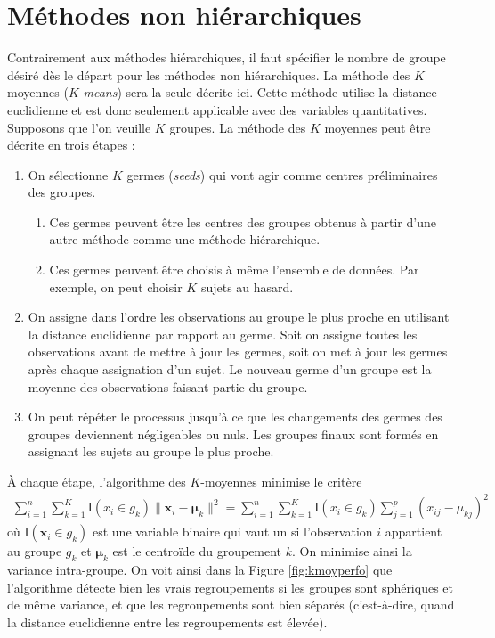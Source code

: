 \documentclass[
  11pt,
  letterpaper,
]{book}
\providecommand{\tightlist}{%
  \setlength{\itemsep}{0pt}\setlength{\parskip}{0pt}}
\theoremstyle{definition}
\theoremstyle{definition}
\theoremstyle{definition}
\theoremstyle{definition}
\theoremstyle{remark}
\begin{document}
\hypertarget{muxe9thodes-non-hiuxe9rarchiques}{%
\section{Méthodes non hiérarchiques}\label{muxe9thodes-non-hiuxe9rarchiques}}

Contrairement aux méthodes hiérarchiques, il faut spécifier le nombre de groupe désiré dès le départ pour les méthodes non hiérarchiques. La méthode des \(K\) moyennes (\(K\) \emph{means}) sera la seule décrite ici. Cette méthode utilise la distance euclidienne et est donc seulement applicable avec des variables quantitatives. Supposons que l'on veuille \(K\) groupes. La méthode des \(K\) moyennes peut être décrite en trois étapes :

\begin{enumerate}
\def\labelenumi{\arabic{enumi})}
\tightlist
\item
  On sélectionne \(K\) germes (\emph{seeds}) qui vont agir comme centres préliminaires des groupes.

  \begin{enumerate}
  \def\labelenumii{\roman{enumii})}
  \tightlist
  \item
    Ces germes peuvent être les centres des groupes obtenus à partir d'une autre méthode comme une méthode hiérarchique.
  \item
    Ces germes peuvent être choisis à même l'ensemble de données. Par exemple, on peut choisir \(K\) sujets au hasard.
  \end{enumerate}
\item
  On assigne dans l'ordre les observations au groupe le plus proche en utilisant la distance euclidienne par rapport au germe. Soit on assigne toutes les observations avant de mettre à jour les germes, soit on met à jour les germes après chaque assignation d'un sujet. Le nouveau germe d'un groupe est la moyenne des observations faisant partie du groupe.
\item
  On peut répéter le processus jusqu'à ce que les changements des germes des groupes deviennent négligeables ou nuls. Les groupes finaux sont formés en assignant les sujets au groupe le plus proche.
\end{enumerate}

À chaque étape, l'algorithme des \(K\)-moyennes minimise le critère
\begin{align*}
\sum_{i=1}^n \sum_{k=1}^K \mathrm{I}(x_i \in g_k)\|\boldsymbol{x}_i - \boldsymbol{\mu}_k\|^2 = \sum_{i=1}^n \sum_{k=1}^K \mathrm{I}(x_i \in g_k) \sum_{j=1}^p (x_{ij}-\mu_{kj})^2
\end{align*}
où \(\mathrm{I}(\boldsymbol{x}_i \in g_k)\) est une variable binaire qui vaut un si l'observation \(i\) appartient au groupe \(g_k\) et \(\boldsymbol{\mu}_k\) est le centroïde du groupement \(k\). On minimise ainsi la variance intra-groupe. On voit ainsi dans la Figure \ref{fig:kmoyperfo} que l'algorithme détecte bien les vrais regroupements si les groupes sont sphériques et de même variance, et que les regroupements sont bien séparés (c'est-à-dire, quand la distance euclidienne entre les regroupements est élevée).
\end{document}
